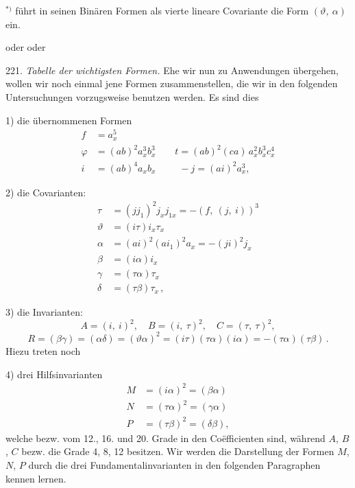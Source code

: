 ${}^{*)}$  f\"uhrt in seinen \glqq Bin\"aren Formen\grqq{} als vierte lineare Covariante die Form $(\vartheta,\ \alpha)$ ein.


oder
oder

221. \textit{Tabelle der wichtigsten Formen.} Ehe wir nun zu Anwendungen \"ubergehen, wollen wir noch einmal jene Formen zusammenstellen, die wir in den folgenden Untersuchungen vorzugsweise benutzen werden. Es sind dies

1) die \"ubernommenen Formen
\[
\begin{aligned}
f &= a_x^5 \\
\varphi &= (ab)^2 a_x^3 b_x^3 \qquad t = (ab)^2(ca)\,a_x^2 b_x^3 c_x^4 \\
i &= (ab)^4 a_x b_x \qquad\ \ -j = (ai)^2 a_x^3,
\end{aligned}
\]

2) die Covarianten:
\[
\begin{aligned}
\tau &= (jj_1)^2 j_x j_{1x} = -(f,\ (j,\ i))^3 \\
\vartheta &= (i\tau)i_x\tau_x \\
\alpha &= (ai)^2(ai_1)^2 a_x = -(ji)^2 j_x \\
\beta &= (i\alpha)i_x \\
\gamma &= (\tau\alpha)\tau_x \\
\delta &= (\tau\beta)\tau_x\,,
\end{aligned}
\]

3) die Invarianten:
\[
A = (i,\ i)^2,\quad B = (i,\ \tau)^2,\quad C = (\tau,\ \tau)^2,
\]
\[
R = (\beta\gamma) = (\alpha\delta) = (\vartheta\alpha)^2 = (i\tau)(\tau\alpha)(i\alpha) = -(\tau\alpha)(\tau\beta)\,.
\]
Hiezu treten noch

4) drei Hilfsinvarianten
\[
\begin{aligned}
M &= (i\alpha)^2 = (\beta\alpha) \\
N &= (\tau\alpha)^2 = (\gamma\alpha) \\
P &= (\tau\beta)^2 = (\delta\beta),
\end{aligned}
\]
welche bezw. vom 12., 16. und 20. Grade in den Co\"efficienten sind, w\"ahrend $A$, $B$, $C$ bezw. die Grade 4, 8, 12 besitzen. Wir werden die Darstellung der Formen $M$, $N$, $P$ durch die drei Fundamentalinvarianten in den folgenden Paragraphen kennen lernen.

